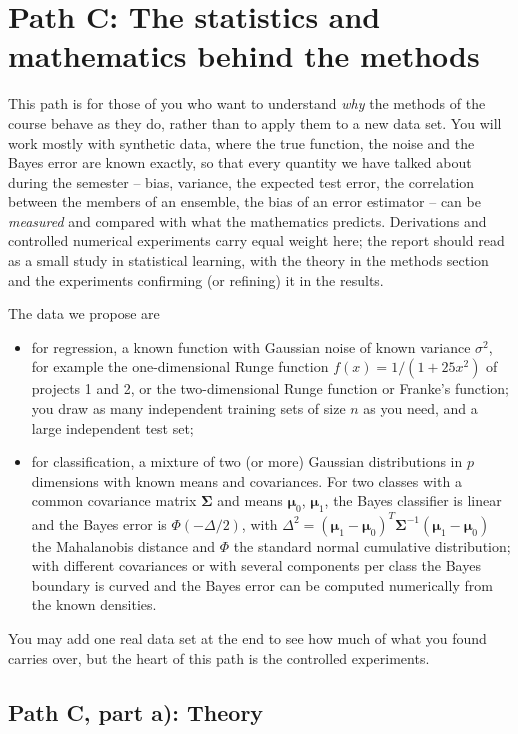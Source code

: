 \documentclass[11pt,a4paper]{article}
\begin{document}
\section*{Path C: The statistics and mathematics behind the methods}

This path is for those of you who want to understand \emph{why} the methods
of the course behave as they do, rather than to apply them to a new data
set.  You will work mostly with synthetic data, where the true function, the
noise and the Bayes error are known exactly, so that every quantity we have
talked about during the semester -- bias, variance, the expected test
error, the correlation between the members of an ensemble, the bias of an
error estimator -- can be \emph{measured} and compared with what the
mathematics predicts.  Derivations and controlled numerical experiments
carry equal weight here; the report should read as a small study in
statistical learning, with the theory in the methods section and the
experiments confirming (or refining) it in the results.

The data we propose are
\begin{itemize}[nosep]
  \item for regression, a known function with Gaussian noise of known
        variance $\sigma^2$, for example the one-dimensional Runge function
        $f(x)=1/(1+25x^2)$ of projects 1 and 2, or the two-dimensional Runge
        function or Franke's function; you draw as many independent training
        sets of size $n$ as you need, and a large independent test set;
  \item for classification, a mixture of two (or more) Gaussian
        distributions in $p$ dimensions with known means and covariances.
        For two classes with a common covariance matrix $\bm{\Sigma}$ and
        means $\bm{\mu}_0$, $\bm{\mu}_1$, the Bayes classifier is linear and
        the Bayes error is $\Phi(-\Delta/2)$, with
        $\Delta^2=(\bm{\mu}_1-\bm{\mu}_0)^T\bm{\Sigma}^{-1}(\bm{\mu}_1-\bm{\mu}_0)$
        the Mahalanobis distance and $\Phi$ the standard normal cumulative
        distribution; with different covariances or with several components
        per class the Bayes boundary is curved and the Bayes error can be
        computed numerically from the known densities.
\end{itemize}
You may add one real data set at the end to see how much of what you found
carries over, but the heart of this path is the controlled experiments.

\subsection*{Path C, part a): Theory}
\end{document}
